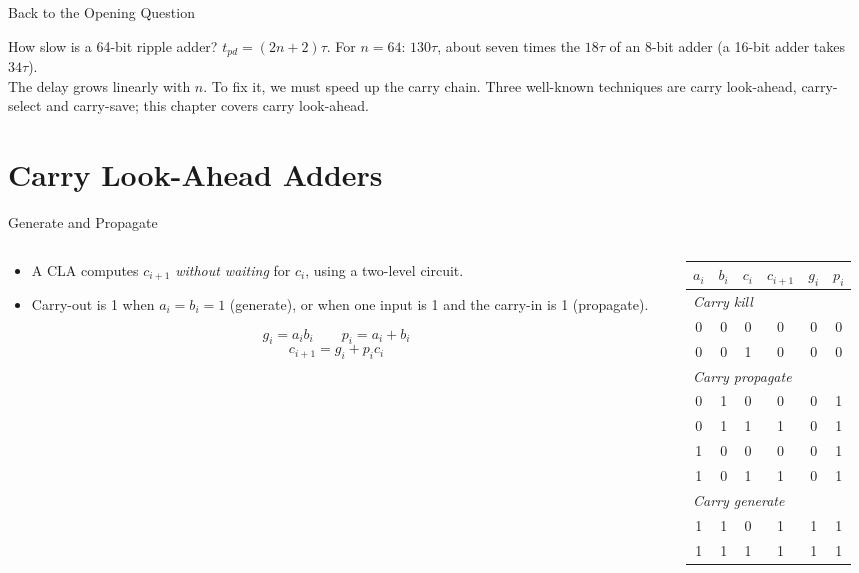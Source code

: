 \documentclass[9pt,aspectratio=169,xcolor=table]{beamer}
\newcommand{\striped}{\rowcolors{1}{white}{stripe}}
\begin{document}
\begin{frame}{Back to the Opening Question}
  \begin{block}{How slow is a 64-bit ripple adder?}
    \small $t_{pd} = (2n + 2)\tau$. For $n = 64$: $130\tau$, about seven times the $18\tau$ of an 8-bit adder (a 16-bit adder takes $34\tau$).\\[2mm]
    The delay grows \alert{linearly} with $n$. To fix it, we must speed up the carry chain. Three well-known techniques are carry look-ahead, carry-select and carry-save; this chapter covers carry look-ahead.
  \end{block}
\end{frame}

\section{Carry Look-Ahead Adders}

\begin{frame}{Generate and Propagate}
  \begin{columns}[c]
  \begin{column}{.5\textwidth}
    \begin{itemize}\small\itemsep3pt
      \item A CLA computes $c_{i+1}$ \emph{without waiting} for $c_i$, using a two-level circuit.
      \item Carry-out is 1 when $a_i = b_i = 1$ (\alert{generate}), or when one input is 1 and the carry-in is 1 (\alert{propagate}).
    \end{itemize}
    \[ g_i = a_ib_i \qquad p_i = a_i + b_i \]
    \[ c_{i+1} = g_i + p_ic_i \]
  \end{column}
  \begin{column}{.48\textwidth}
    \centering\scriptsize\striped
    \begin{tabular}{@{}ccc|c|cc@{}}
      \toprule
      $a_i$ & $b_i$ & $c_i$ & $c_{i+1}$ & $g_i$ & $p_i$ \\
      \midrule
      \multicolumn{6}{l}{\textit{Carry kill}} \\
      0&0&0&0&0&0 \\ 0&0&1&0&0&0 \\
      \multicolumn{6}{l}{\textit{Carry propagate}} \\
      0&1&0&0&0&1 \\ 0&1&1&1&0&1 \\ 1&0&0&0&0&1 \\ 1&0&1&1&0&1 \\
      \multicolumn{6}{l}{\textit{Carry generate}} \\
      1&1&0&1&1&1 \\ 1&1&1&1&1&1 \\
      \bottomrule
    \end{tabular}
  \end{column}
  \end{columns}
\end{frame}
\end{document}
